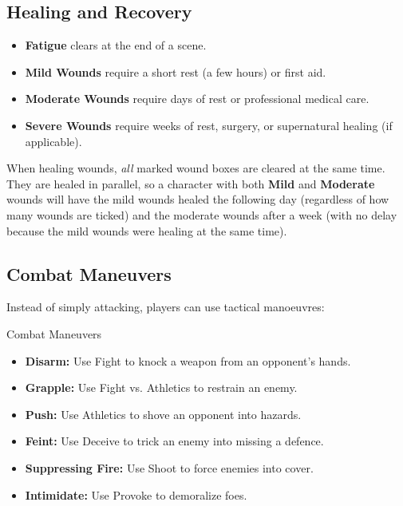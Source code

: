 \begin{multicols}{2}
\subsection{Healing and Recovery}\label{core:healing}

\begin{itemize}
    \item \textbf{Fatigue} clears at the end of a scene.
    \item \textbf{Mild Wounds} require a short rest (a few hours) or first aid.
    \item \textbf{Moderate Wounds} require days of rest or professional medical care.
    \item \textbf{Severe Wounds} require weeks of rest, surgery, or supernatural healing (if applicable).
\end{itemize}

When healing wounds, \emph{all} marked wound boxes are cleared at the same time. They are healed in parallel, so a character with both \textbf{Mild} and \textbf{Moderate} wounds will have the mild wounds healed the following day (regardless of how many wounds are ticked) and the moderate wounds after a week (with no delay because the mild wounds were healing at the same time).

\subsection{Combat Maneuvers}
Instead of simply attacking, players can use tactical manoeuvres:

\begin{Example}{Combat Maneuvers}
	\begin{itemize}\raggedright
    	\item \textbf{Disarm:} Use Fight to knock a weapon from an opponent’s hands.
	    \item \textbf{Grapple:} Use Fight vs. Athletics to restrain an enemy.
    	\item \textbf{Push:} Use Athletics to shove an opponent into hazards.
	    \item \textbf{Feint:} Use Deceive to trick an enemy into missing a defence.
    	\item \textbf{Suppressing Fire:} Use Shoot to force enemies into cover.
	    \item \textbf{Intimidate:} Use Provoke to demoralize foes.
	\end{itemize}
\end{Example}


\end{multicols}
